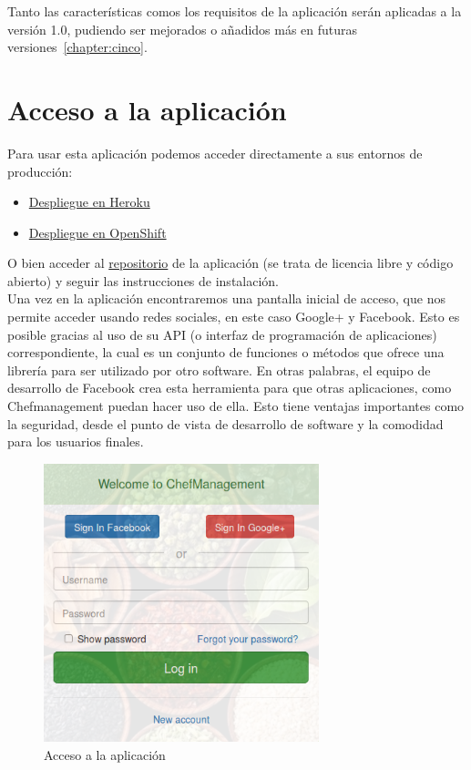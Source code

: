 Tanto las características comos los requisitos de la aplicación serán aplicadas a la versión 1.0, pudiendo ser mejorados o añadidos más en futuras versiones~\ref{chapter:cinco}.

\vspace*{0.2in}
\section{Acceso a la aplicación}\label{cap.2.1}

Para usar esta aplicación podemos acceder directamente a sus entornos de producción:
\begin{itemize}
	\item \href{http://chefmanagement.herokuapp.com/}{Despliegue en Heroku}
	\item \href{http://chefmanagement-esit.rhcloud.com/}{Despliegue en OpenShift}
\end{itemize}

O bien acceder al \href{https://github.com/alu0100207385/ChefManagement}{repositorio} de la aplicación (se trata de licencia libre y código abierto) y seguir las instrucciones de instalación. \\

Una vez en la aplicación encontraremos una pantalla inicial de acceso, que nos permite acceder usando redes sociales, en este caso Google+ y Facebook. Esto es posible gracias al uso de su API (o interfaz de programación de aplicaciones) correspondiente, la cual es un conjunto de funciones o métodos que ofrece una librería para ser utilizado por otro software. En otras palabras, el equipo de desarrollo de Facebook crea esta herramienta para que otras aplicaciones, como Chefmanagement puedan hacer uso de ella. Esto tiene ventajas importantes como la seguridad, desde el punto de vista de desarrollo de software y la comodidad para los usuarios finales. \\

\begin{figure}[H]
	\centering
	\includegraphics[width=8cm]{./images/chefmanagement-root.png}
	\caption{Acceso a la aplicación} \label{fig:chefmanagement-root}
\end{figure}

